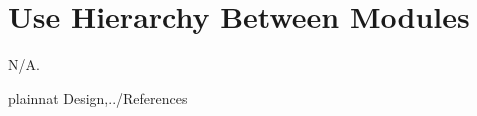 \documentclass[12pt, titlepage]{article}
\begin{document}
\section{Use Hierarchy Between Modules} \label{SecUse}
N/A.
%
%


 {plainnat}
 {Design,../References}
\end{document}
